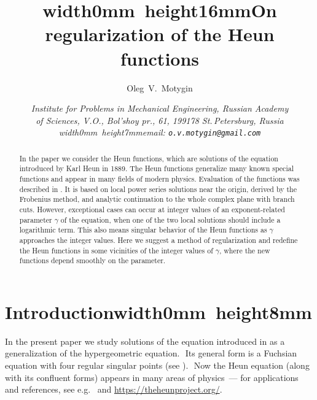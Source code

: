 \documentclass[11pt]{article}
\begin{document}
\title{\mbox{\vrule width0mm height16mm}\bf On regularization of the Heun functions}

\author{{\large Oleg\ V.\ Motygin}}
 
\date{\it Institute for Problems in Mechanical Engineering, Russian Academy\\ of
Sciences,
 V.O., Bol'shoy pr., 61, 199178 St.\,Petersburg, Russia\\ 
\mbox{\vrule width0mm height7mm}{\rm email: \texttt{o.v.motygin@gmail.com}}}

\maketitle

\begin{abstract}

In the paper we consider the Heun functions, which are solutions of the
equation introduced by Karl Heun in 1889. The Heun functions generalize many known special functions and appear in many fields of modern physics.
Evaluation of the functions was described in \cite{Mot15}. It is based on local power series solutions near the origin, derived by the Frobenius method, and analytic continuation to the whole complex plane with branch cuts. However, exceptional cases can occur at integer values of an exponent-related parameter $\gamma$ of the equation, when one of the two local solutions should include a logarithmic term. This also means singular behavior of the Heun functions as $\gamma$ approaches the integer values.
Here we suggest a method of regularization and redefine the Heun functions in some vicinities of the integer values of $\gamma$, where the new functions depend smoothly on the parameter.

\end{abstract}

\def\texttrademark{}

\section{Introduction\mbox{\vrule width0mm height8mm}}
\label{intro0}

In the present paper we study solutions of the equation introduced in \cite{Heun} as a generalization of the
hypergeometric equation.\,\ Its general form is a Fuchsian equation with four regular singular points (see
\cite{Ronveaux1995,SlavyanovLay2000,192-Maier2007}).\,\ Now the
Heun equation (along with its confluent forms) appears in many areas of physics~--- for applications and references, see e.g.\  \cite{Hortacsu2017,BirkandanHortacsu2017,Ishkhanyan2018,Ishkhanyans2018,Mot18,Oberlack2020} and  \url{https://theheunproject.org/}.
\end{document}
